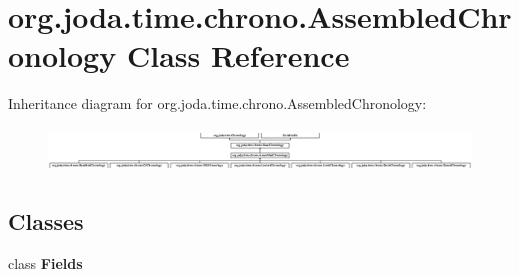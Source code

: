 \hypertarget{classorg_1_1joda_1_1time_1_1chrono_1_1_assembled_chronology}{\section{org.\-joda.\-time.\-chrono.\-Assembled\-Chronology Class Reference}
\label{classorg_1_1joda_1_1time_1_1chrono_1_1_assembled_chronology}
}
Inheritance diagram for org.\-joda.\-time.\-chrono.\-Assembled\-Chronology\-:\begin{figure}[H]
\begin{center}
\leavevmode
\includegraphics[height=1.194030cm]{classorg_1_1joda_1_1time_1_1chrono_1_1_assembled_chronology}
\end{center}
\end{figure}
\subsection*{Classes}
\begin{DoxyCompactItemize}
\item 
class {\bfseries Fields}
\end{DoxyCompactItemize}
